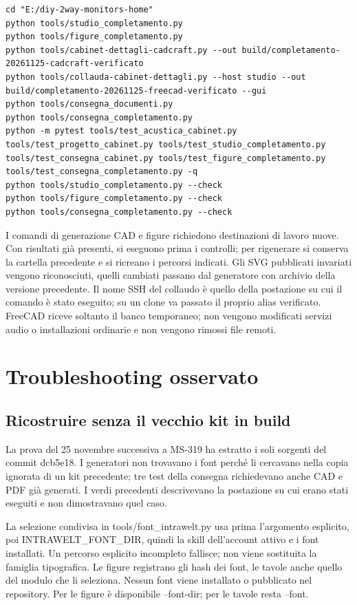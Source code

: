 \documentclass[
  italian,
  11pt,
  a4paper,
]{article}
\begin{document}
\begin{lstlisting}
cd "E:/diy-2way-monitors-home"
python tools/studio_completamento.py
python tools/figure_completamento.py
python tools/cabinet-dettagli-cadcraft.py --out build/completamento-20261125-cadcraft-verificato
python tools/collauda-cabinet-dettagli.py --host studio --out build/completamento-20261125-freecad-verificato --gui
python tools/consegna_documenti.py
python tools/consegna_completamento.py
python -m pytest tools/test_acustica_cabinet.py tools/test_progetto_cabinet.py tools/test_studio_completamento.py tools/test_consegna_cabinet.py tools/test_figure_completamento.py tools/test_consegna_completamento.py -q
python tools/studio_completamento.py --check
python tools/figure_completamento.py --check
python tools/consegna_completamento.py --check
\end{lstlisting}

I comandi di generazione CAD e figure richiedono destinazioni di lavoro nuove. Con risultati
già presenti, si eseguono prima i controlli; per rigenerare si conserva la cartella
precedente e si ricreano i percorsi indicati. Gli SVG pubblicati invariati vengono
riconosciuti, quelli cambiati passano dal generatore con archivio della versione precedente.
Il nome SSH del collaudo è quello della postazione su cui il comando è stato eseguito; su un
clone va passato il proprio alias verificato. FreeCAD riceve soltanto il banco temporaneo;
non vengono modificati servizi audio o installazioni ordinarie e non vengono rimossi file
remoti.

\section{Troubleshooting osservato}\label{troubleshooting-osservato}

\subsection{Ricostruire senza il vecchio kit in
build}\label{ricostruire-senza-il-vecchio-kit-in-build}

La prova del 25 novembre successiva a MS-319 ha estratto i soli sorgenti del commit dcb5e18.
I generatori non trovavano i font perché li cercavano nella copia ignorata di un kit
precedente; tre test della consegna richiedevano anche CAD e PDF già generati. I verdi
precedenti descrivevano la postazione su cui erano stati eseguiti e non dimostravano quel
caso.

La selezione condivisa in tools/font\_intrawelt.py usa prima l'argomento esplicito, poi
INTRAWELT\_FONT\_DIR, quindi la skill dell'account attivo e i font installati. Un percorso
esplicito incompleto fallisce; non viene sostituita la famiglia tipografica. Le figure
registrano gli hash dei font, le tavole anche quello del modulo che li seleziona. Nessun
font viene installato o pubblicato nel repository. Per le figure è disponibile --font-dir;
per le tavole resta --font.
\end{document}
